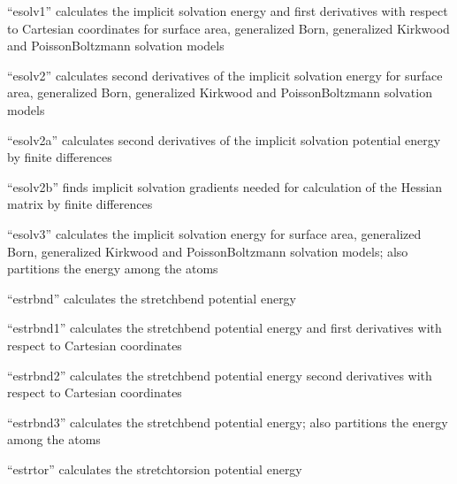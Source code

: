 \documentclass[letterpaper,11pt,english]{sphinxmanual}
\begin{document}

“esolv1” calculates the implicit solvation energy and
first derivatives with respect to Cartesian coordinates
for surface area, generalized Born, generalized Kirkwood
and Poisson\sphinxhyphen{}Boltzmann solvation models


“esolv2” calculates second derivatives of the implicit
solvation energy for surface area, generalized Born,
generalized Kirkwood and Poisson\sphinxhyphen{}Boltzmann solvation models


“esolv2a” calculates second derivatives of the implicit solvation
potential energy by finite differences


“esolv2b” finds implicit solvation gradients needed for
calculation of the Hessian matrix by finite differences


“esolv3” calculates the implicit solvation energy for
surface area, generalized Born, generalized Kirkwood
and Poisson\sphinxhyphen{}Boltzmann solvation models; also partitions
the energy among the atoms


“estrbnd” calculates the stretch\sphinxhyphen{}bend potential energy


“estrbnd1” calculates the stretch\sphinxhyphen{}bend potential energy and
first derivatives with respect to Cartesian coordinates


“estrbnd2” calculates the stretch\sphinxhyphen{}bend potential energy
second derivatives with respect to Cartesian coordinates


“estrbnd3” calculates the stretch\sphinxhyphen{}bend potential energy;
also partitions the energy among the atoms


“estrtor” calculates the stretch\sphinxhyphen{}torsion potential energy

\end{document}
